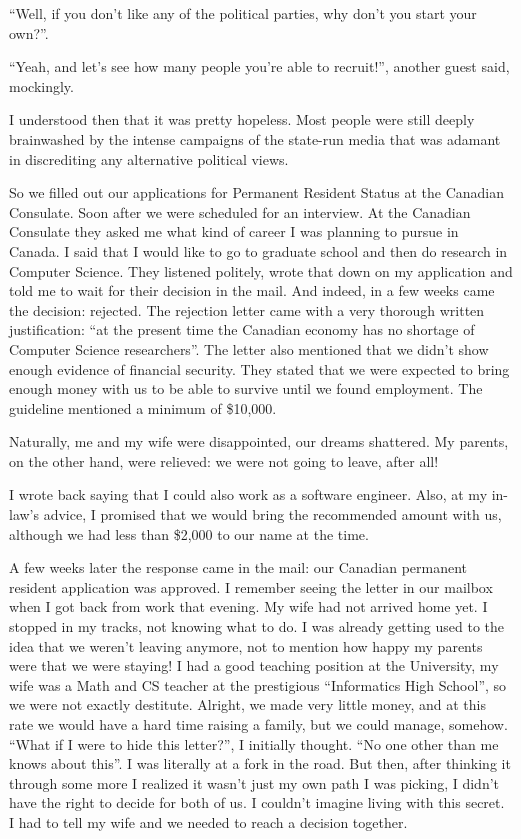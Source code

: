 \documentclass[12pt]{book}
\begin{document}
``Well, if you don't like any of the political parties, why don't you
start your own?''.

``Yeah, and let's see how many people you're able to recruit!'', another
guest said, mockingly.

I understood then that it was pretty hopeless. Most people were still
deeply brainwashed by the intense campaigns of the state-run media that
was adamant in discrediting any alternative political views.

So we filled out our applications for Permanent Resident Status at the
Canadian Consulate. Soon after we were scheduled for an interview. At
the Canadian Consulate they asked me what kind of career I was planning
to pursue in Canada. I said that I would like to go to graduate school
and then do research in Computer Science. They listened politely, wrote
that down on my application and told me to wait for their decision in
the mail. And indeed, in a few weeks came the decision: rejected. The
rejection letter came with a very thorough written justification: ``at
the present time the Canadian economy has no shortage of Computer
Science researchers''. The letter also mentioned that we didn't show
enough evidence of financial security. They stated that we were expected
to bring enough money with us to be able to survive until we found
employment. The guideline mentioned a minimum of \$10,000.

Naturally, me and my wife were disappointed, our dreams shattered. My
parents, on the other hand, were relieved: we were not going to leave,
after all!

I wrote back saying that I could also work as a software engineer. Also,
at my in-law's advice, I promised that we would bring the recommended
amount with us, although we had less than \$2,000 to our name at the
time.

A few weeks later the response came in the mail: our Canadian permanent
resident application was approved. I remember seeing the letter in our
mailbox when I got back from work that evening. My wife had not arrived
home yet. I stopped in my tracks, not knowing what to do. I was already
getting used to the idea that we weren't leaving anymore, not to mention
how happy my parents were that we were staying! I had a good teaching
position at the University, my wife was a Math and CS teacher at the
prestigious ``Informatics High School'', so we were not exactly
destitute. Alright, we made very little money, and at this rate we would
have a hard time raising a family, but we could manage, somehow. ``What
if I were to hide this letter?'', I initially thought. ``No one other
than me knows about this''. I was literally at a fork in the road. But
then, after thinking it through some more I realized it wasn't just my
own path I was picking, I didn't have the right to decide for both of
us. I couldn't imagine living with this secret. I had to tell my wife
and we needed to reach a decision together.
\end{document}
